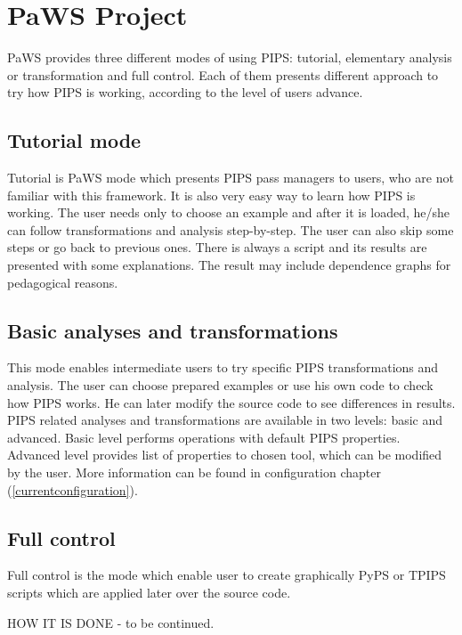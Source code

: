 \section{PaWS Project}
\label{paws_project}

PaWS provides three different modes of using PIPS: tutorial, elementary analysis or transformation and full control. Each of them presents different approach to try how PIPS is working, according to the level of users advance.


\subsection{Tutorial mode}
Tutorial is PaWS mode which presents PIPS pass managers to users, who are not familiar with this framework. It is also very easy way to learn how PIPS is working. The user needs only to choose an example and after it is loaded, he/she can follow transformations and analysis step-by-step. The user can also skip some steps or go back to previous ones. There is always a script and its results are presented with some explanations. The result may include dependence graphs for pedagogical reasons.

\subsection{Basic analyses and transformations}
This mode enables intermediate users to try specific PIPS transformations and analysis. The user can choose prepared examples or use his own code to check how PIPS works. He can later modify the source code to see differences in results. PIPS related analyses and transformations are available in two levels: basic and advanced. Basic level performs operations with default PIPS properties. Advanced level provides list of properties to chosen tool, which can be modified by the user. More information can be found in configuration chapter (\ref{currentconfiguration}).

\subsection{Full control}
Full control is the mode which enable user to create graphically PyPS or TPIPS scripts which are applied later over the source code.

HOW IT IS DONE - to be continued.